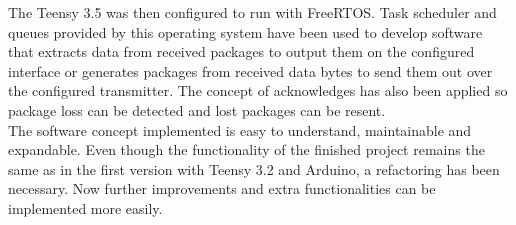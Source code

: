 The Teensy 3.5 was then configured to run with FreeRTOS. Task scheduler and queues provided by this operating system have been used to develop software that extracts data from received packages to output them on the configured interface or generates packages from received data bytes to send them out over the configured transmitter. The concept of acknowledges has also been applied so package loss can be detected and lost packages can be resent. \\
The software concept implemented is easy to understand, maintainable and expandable. Even though the functionality of the finished project remains the same as in the first version with Teensy 3.2 and Arduino, a refactoring has been necessary. Now further improvements and extra functionalities can be implemented more easily. 